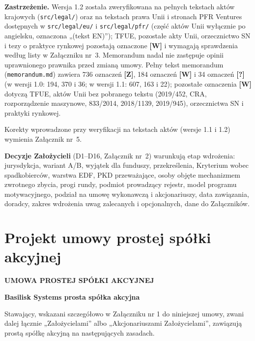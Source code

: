 \documentclass[12pt,a4paper]{report}
\newcommand{\CompanyFull}{Basilisk Systems prosta spółka akcyjna}
\newcommand{\Wiar}[1]{\textbf{[#1]}}
\begin{document}
\textbf{Zastrzeżenie.} Wersja 1.2 została zweryfikowana na pełnych tekstach aktów krajowych (\texttt{src/legal/}) oraz na tekstach prawa Unii i stronach PFR Ventures dostępnych w \texttt{src/legal/eu/} i \texttt{src/legal/pfr/} (część aktów Unii wyłącznie po angielsku, oznaczona „(tekst EN)”); TFUE, pozostałe akty Unii, orzecznictwo SN i tezy o praktyce rynkowej pozostają oznaczone \Wiar{W} i wymagają sprawdzenia według listy w Załączniku nr~3. Memorandum nadal nie zastępuje opinii uprawnionego prawnika przed zmianą umowy. Pełny tekst memorandum (\texttt{memorandum.md}) zawiera 736 oznaczeń \textbf{[Z]}, 184 oznaczeń \textbf{[W]} i 34 oznaczeń \textbf{[?]} (w wersji 1.0: 194, 370 i 36; w wersji 1.1: 607, 163 i 22); pozostałe oznaczenia \textbf{[W]} dotyczą TFUE, aktów Unii bez pobranego tekstu (2019/452, CRA, rozporządzenie maszynowe, 833/2014, 2018/1139, 2019/945), orzecznictwa SN i praktyki rynkowej.

Korekty wprowadzone przy weryfikacji na tekstach aktów (wersje 1.1 i 1.2) wymienia Załącznik nr~5.

\textbf{Decyzje Założycieli} (D1--D16, Załącznik nr~2) warunkują etap wdrożenia: jurysdykcja, wariant A/B, wyjątek dla funduszy, przekreślenia, Kryterium wobec spadkobierców, warstwa EDF, PKD przeważające, osoby objęte mechanizmem zwrotnego zbycia, progi rundy, podmiot prowadzący rejestr, model programu motywacyjnego, podział na umowę wykonawczą i akcjonariuszy, data zawiązania, doradcy, zakres wdrożenia uwag zalecanych i opcjonalnych, dane do Załączników.


\clearpage
\chapter*{Projekt umowy prostej spółki akcyjnej}

\begin{center}
{\Large\bfseries UMOWA PROSTEJ SPÓŁKI AKCYJNEJ}\par
\vspace{0.25cm}
{\LARGE\bfseries \CompanyFull}\par
\vspace{0.6cm}
\end{center}

Stawający, wskazani szczegółowo w Załączniku nr 1 do niniejszej umowy, zwani dalej łącznie „Założycielami” albo „Akcjonariuszami Założycielami”, zawiązują prostą spółkę akcyjną na następujących zasadach.
\end{document}
